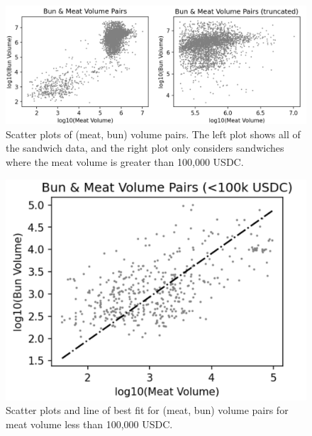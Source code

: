         \begin{figure}
            \label{fig:meat-bun-pairplots}
            \centering
            \includegraphics[scale=.43]{figs/meat-and-bun-pairwise-plot.png}
            \caption{Scatter plots of (meat, bun) volume pairs. The left plot shows all of the sandwich data, and the right plot only considers sandwiches where the meat volume is greater than 100,000 USDC.}
        \end{figure}

        \begin{figure}
            \label{fig:meat-bun-pairplot-small}
            \centering
            \includegraphics[scale=.43]{figs/meat-and-bun-pairwise-small-meat.png}
            \caption{Scatter plots and line of best fit for (meat, bun) volume pairs for meat volume less than 100,000 USDC.}
        \end{figure}
        

